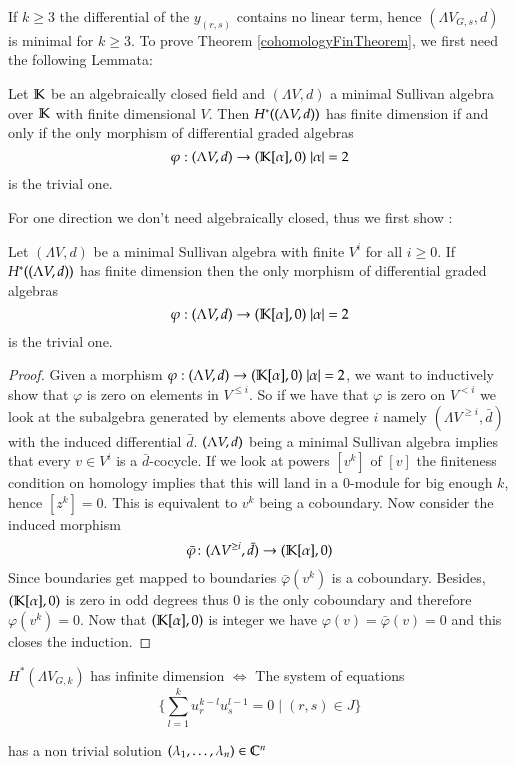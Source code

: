   If $k \geq 3$ the differential of the $y_{(r,s)}$ contains no linear term, hence
  $(\Lambda V_{G,s} ,d)$ is minimal for $k \geq 3$. To prove Theorem \ref{cohomologyFinTheorem}, we first need the following Lemmata:
 
 \begin{Lemma}
  Let $\mathbb{K}$ be an algebraically closed field and $(\Lambda V,d)$ a minimal Sullivan
  algebra over $\mathbb{K}$ with finite dimensional $V$. 
  Then $H^*((\Lambda V,d))$ has finite dimension if and only if   
  the only morphism of differential graded algebras 
  $$ \varphi : (\Lambda V,d) \to (\mathbb{K}[\alpha],0) \; |\alpha| = 2 $$ 
  is the trivial one.
 \end{Lemma}
 For one direction we don't need algebraically closed, thus we first show :
  \begin{Lemma}
   Let $(\Lambda V,d)$ be a minimal Sullivan algebra with finite $V^i$ for all $i \geq 0$. \newline
  If $H^*((\Lambda V,d))$ has finite dimension then
  the only morphism of differential graded algebras 
  $$ \varphi : (\Lambda V,d) \to (\mathbb{K}[\alpha],0) \; |\alpha| = 2 $$ 
  is the trivial one.
  \end{Lemma}

 \begin{proof}
 Given a morphism  $ \varphi : (\Lambda V,d) \to (\mathbb{K}[\alpha],0) \; |\alpha| = 2 $, we want to inductively show that
 $\varphi$ is zero on elements in $V^{\leq i}$. So if we have that $\varphi$ is zero on $V^{< i}$ we look at the
 subalgebra generated by elements above degree $i$ namely $(\Lambda V^{\geq i} , \bar{d})$ with the induced differential $\bar{d}$.
 $(\Lambda V,d)$ being a minimal Sullivan algebra implies that every $ v \in V^i$ is a $\bar{d}$-cocycle. If we look at powers
 $[v^k]$ of $[v]$ the finiteness condition on homology implies that this will land in a $0$-module for big enough $k$, hence 
 $[z^k] = 0$. This is equivalent to $v^k$ being a coboundary. Now consider the induced morphism
 $$ \bar{\varphi} \colon (\Lambda V^{\geq i} , \bar{d}) \to (\mathbb{K}[\alpha],0)$$
 Since boundaries get mapped to boundaries $\bar{\varphi}(v^k)$ is a coboundary. Besides, $(\mathbb{K}[\alpha],0)$ is zero in odd degrees thus
 $0$ is the only coboundary and therefore $\varphi(v^k) = 0$. Now that $(\mathbb{K}[\alpha],0)$ is integer we have 
 $\varphi(v)= \bar{\varphi}(v) = 0$ and this closes the induction.
   
 \end{proof}

 
\begin{Lemma}
\label{lma:cohomoly+equations}
 $H^*(\Lambda V_{G,k})$ has infinite dimension $\iff$ The system of equations \\
 \begin{equation}
 \label{systemofequations}
 {\lbrace \sum_{l = 1}^k u_r^{k - l} u_s^{l - 1} = 0 \; | \; (r,s) \in J \rbrace}  
 \end{equation}
 
 has a non trivial solution 
 $(\lambda_1 , \dotsc, \lambda_n) \in \mathbb{C}^n$
\end{Lemma}

